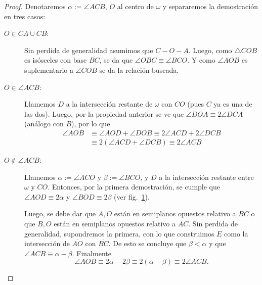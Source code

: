 \documentclass[11pt,a4paper]{book}
\begin{document}
\begin{proof}
Denotaremos $\alpha:=\angle ACB$, $O$ al centro de $\omega$ y separaremos la demostración en tres casos:
\begin{description}
	\item[$O\in CA\cup CB$:] Sin perdida de generalidad asumimos que $C-O-A$. Luego, como $\triangle COB$ es isósceles con base $\overline{BC}$, se da que $\angle OBC\equiv\angle BCO$. Y como $\angle AOB$ es suplementario a $\angle COB$ se da la relación buscada.
	\item[$O\in\angle ACB$:] Llamemos $D$ a la intersección restante de $\omega$ con $CO$ (pues $C$ ya es una de las dos). Luego, por la propiedad anterior se ve que $\angle DOA\equiv2\angle DCA$ (análogo con $B$), por lo que
	\begin{align*}
		\angle AOB&\equiv\angle AOD+\angle DOB\equiv2\angle ACD+2\angle DCB\\
		&\equiv 2(\angle ACD+\angle DCB)\equiv 2\angle ACB
	\end{align*}
\item[$O\notin\angle ACB$:] Llamemos $\alpha:=\angle ACO$ y $\beta:=\angle BCO$, y $D$ a la intersección restante entre $\omega$ y $CO$. Entonces, por la primera demostración, se cumple que $\angle AOD\equiv2\alpha$ y $\angle BOD\equiv2\beta$ (ver fig.~\ref{fig:angle-arc-difference}).
	\begin{figure}
	\centering
		\caption{}\label{fig:angle-arc-difference}
	\end{figure}

	Luego, se debe dar que $A,O$ están en semiplanos opuestos relativo a $BC$ o que $B,O$ están en semiplanos opuestos relativo a $AC$. Sin perdida de generalidad, supondremos la primera, con lo que construimos $E$ como la intersección de $\overline{AO}$ con $\overline{BC}$. De esto se concluye que $\beta<\alpha$ y que $\angle ACB\equiv\alpha-\beta$. Finalmente
	$$\angle AOB\equiv2\alpha-2\beta\equiv2(\alpha-\beta)\equiv2\angle ACB.$$
\end{description}
\end{proof}
\end{document}
